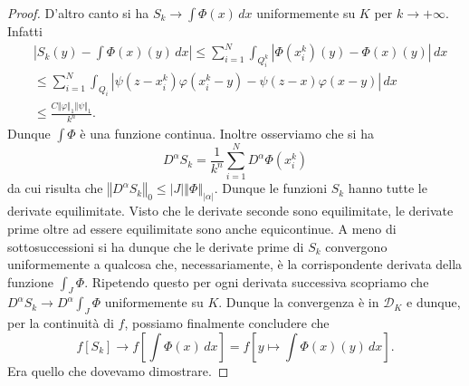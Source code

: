 \documentclass[italian,a4paper,oneside,headinclude]{scrbook}
\renewcommand{\phi}{\varphi}
\newcommand{\D}{\mathcal D}
\newcommand{\abs}[1]{{\left|#1\right|}}
\newcommand{\Abs}[1]{{\left\Vert #1\right\Vert}}
\begin{document}
\begin{proof}
  D'altro canto si ha $S_k  \to \int \Phi(x)\, dx$ uniformemente su $K$
  per $k\to +\infty$. Infatti
  \begin{align*}
    &\abs{S_k(y)-\int \Phi(x)(y)\, dx}
    \le \sum_{i=1}^N \int_{Q_i^k} \abs{\Phi(x_i^k)(y)-\Phi(x)(y)}\, dx \\
    &\le \sum_{i=1}^N \int_{Q_i}
    \abs{\psi(z-x_i^k)\phi(x_i^k-y)-\psi(z-x)\phi(x-y)}\, dx \\
    &\le \frac{C \Abs{\phi}_1 \Abs{\psi}_1}{k^n}.
  \end{align*}
  Dunque $\int \Phi$ è una funzione continua. Inoltre osserviamo che si
  ha
  \[
  D^\alpha S_k = \frac{1}{k^n}\sum_{i=1}^N D^\alpha \Phi(x_i^k)
  \]
  da cui risulta che
  $\Abs{D^\alpha S_k}_0\le |J|  \Abs{\Phi}_{\abs{\alpha}}$.
  Dunque le funzioni $S_k$ hanno tutte le derivate equilimitate. Visto
  che le derivate seconde sono equilimitate, le derivate prime oltre
  ad essere equilimitate sono anche equicontinue. A meno di
  sottosuccessioni si ha dunque che le derivate prime di $S_k$
  convergono uniformemente a qualcosa che, necessariamente, è la
  corrispondente derivata della funzione $\int_J \Phi$. Ripetendo questo
  per ogni derivata successiva scopriamo che
  $D^\alpha S_k \to D^\alpha \int_J \Phi$ uniformemente su $K$.
  Dunque la convergenza è in $\D_K$ e dunque, per la continuità di
  $f$, possiamo finalmente concludere che
  \[
  f[S_k] \to f\left[\int \Phi(x)\, dx\right] = f\left[y \mapsto \int \Phi(x)(y)\, dx\right].
  \]
  Era quello che dovevamo dimostrare.
\end{proof}
\end{document}
